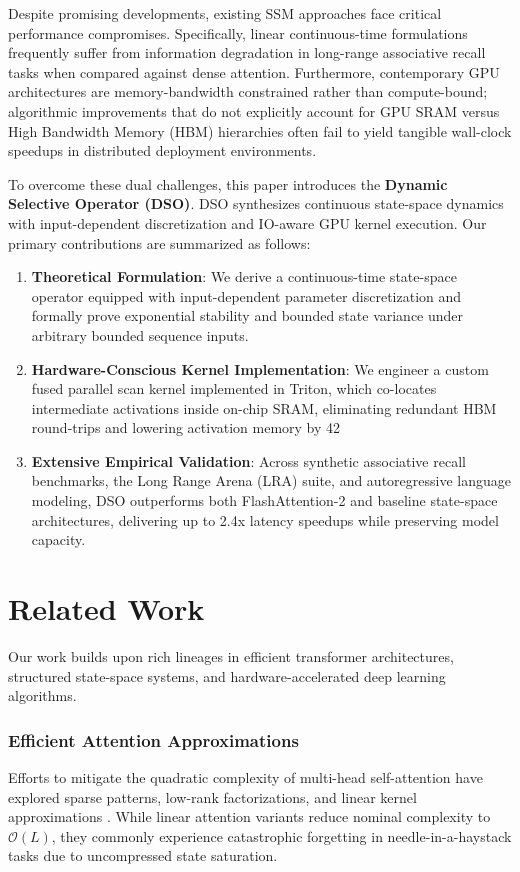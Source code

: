 \documentclass{article}
\begin{document}
Despite promising developments, existing SSM approaches face critical performance compromises. Specifically, linear continuous-time formulations frequently suffer from information degradation in long-range associative recall tasks when compared against dense attention. Furthermore, contemporary GPU architectures are memory-bandwidth constrained rather than compute-bound; algorithmic improvements that do not explicitly account for GPU SRAM versus High Bandwidth Memory (HBM) hierarchies often fail to yield tangible wall-clock speedups in distributed deployment environments.

To overcome these dual challenges, this paper introduces the \textbf{Dynamic Selective Operator (DSO)}. DSO synthesizes continuous state-space dynamics with input-dependent discretization and IO-aware GPU kernel execution. Our primary contributions are summarized as follows:

\begin{enumerate}
  \item \textbf{Theoretical Formulation}: We derive a continuous-time state-space operator equipped with input-dependent parameter discretization and formally prove exponential stability and bounded state variance under arbitrary bounded sequence inputs.
  \item \textbf{Hardware-Conscious Kernel Implementation}: We engineer a custom fused parallel scan kernel implemented in Triton, which co-locates intermediate activations inside on-chip SRAM, eliminating redundant HBM round-trips and lowering activation memory by 42%
  \item \textbf{Extensive Empirical Validation}: Across synthetic associative recall benchmarks, the Long Range Arena (LRA) suite, and autoregressive language modeling, DSO outperforms both FlashAttention-2 and baseline state-space architectures, delivering up to 2.4x latency speedups while preserving model capacity.
\end{enumerate}


\section{Related Work}
Our work builds upon rich lineages in efficient transformer architectures, structured state-space systems, and hardware-accelerated deep learning algorithms.

\subsubsection{Efficient Attention Approximations}
Efforts to mitigate the quadratic complexity of multi-head self-attention have explored sparse patterns, low-rank factorizations, and linear kernel approximations \cite{vaswani2017attention, devlin2018bert}. While linear attention variants reduce nominal complexity to $\mathcal{O}(L)$, they commonly experience catastrophic forgetting in needle-in-a-haystack tasks due to uncompressed state saturation.
\end{document}
